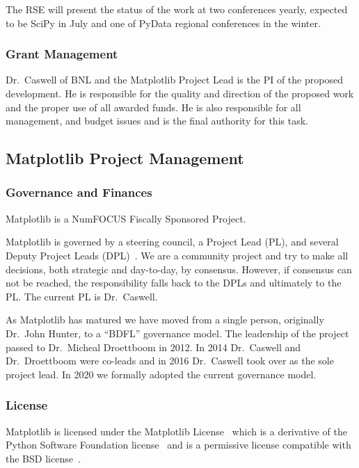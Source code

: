 \documentclass[12pt]{article}
\numberwithin{page}{section}
\begin{document}
The RSE will present the status of the work at two conferences yearly,
expected to be SciPy in July and one of PyData regional conferences in
the winter.


\subsubsection{Grant Management}

Dr.\ Caswell of BNL and the Matplotlib Project Lead is the PI of the proposed
development.  He is responsible for the quality and direction of the proposed
work and the proper use of all awarded funds.  He is also responsible for all
management, and budget issues and is the final authority for this task.


\subsection{Matplotlib Project Management}
\subsubsection{Governance and Finances}

Matplotlib is a NumFOCUS Fiscally Sponsored Project.

Matplotlib is governed by a steering council, a Project Lead (PL), and
several Deputy Project Leads (DPL)~\cite{gov}.  We are a community
project and try to make all decisions, both strategic and day-to-day,
by consensus.  However, if consensus can not be reached, the
responsibility falls back to the DPLs and ultimately to the PL.  The
current PL is Dr.\ Caswell.

As Matplotlib has matured we have moved from a single person,
originally Dr.\ John Hunter, to a ``BDFL'' governance model.  The
leadership of the project passed to Dr.\ Micheal Droettboom in 2012.
In 2014 Dr.\ Caswell and Dr.\ Droettboom were co-leads and in 2016
Dr.\ Caswell took over as the sole project lead.  In 2020 we formally
adopted the current governance model.

\subsubsection{License}

Matplotlib is licensed under the Matplotlib License~\cite{mpl_lic}
which is a derivative of the Python Software Foundation
license~\cite{psf_lic} and is a permissive license compatible with the
BSD license~\cite{jdh_bsd_opinions}.
\end{document}
